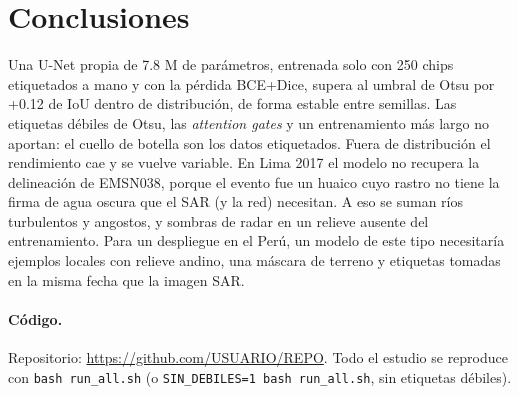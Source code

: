 \documentclass{article}
\begin{document}
\section{Conclusiones}

Una U-Net propia de 7.8 M de parámetros, entrenada solo con 250 chips etiquetados a mano y con la pérdida BCE+Dice, supera al umbral de Otsu por +0.12 de IoU dentro de distribución, de forma estable entre semillas. Las etiquetas débiles de Otsu, las \emph{attention gates} y un entrenamiento más largo no aportan: el cuello de botella son los datos etiquetados. Fuera de distribución el rendimiento cae y se vuelve variable. En Lima 2017 el modelo no recupera la delineación de EMSN038, porque el evento fue un huaico cuyo rastro no tiene la firma de agua oscura que el SAR (y la red) necesitan. A eso se suman ríos turbulentos y angostos, y sombras de radar en un relieve ausente del entrenamiento. Para un despliegue en el Perú, un modelo de este tipo necesitaría ejemplos locales con relieve andino, una máscara de terreno y etiquetas tomadas en la misma fecha que la imagen SAR.

\paragraph{Código.} Repositorio: \url{https://github.com/USUARIO/REPO}. Todo el estudio se reproduce con \texttt{bash run\_all.sh} (o \texttt{SIN\_DEBILES=1 bash run\_all.sh}, sin etiquetas débiles).
\end{document}
